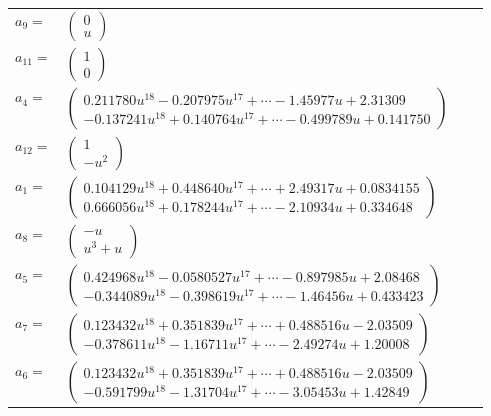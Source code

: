 \documentclass[1p]{elsarticle_modified}
\theoremstyle{definition}
\begin{document}
\begin{tabular}{m{7pt} m{180pt} m{7pt} m{180pt} }
\flushright $a_{9}=$&$\begin{pmatrix}0\\u\end{pmatrix}$ \\
\flushright $a_{11}=$&$\begin{pmatrix}1\\0\end{pmatrix}$ \\
\flushright $a_{4}=$&$\begin{pmatrix}0.211780 u^{18}-0.207975 u^{17}+\cdots-1.45977 u+2.31309\\-0.137241 u^{18}+0.140764 u^{17}+\cdots-0.499789 u+0.141750\end{pmatrix}$ \\
\flushright $a_{12}=$&$\begin{pmatrix}1\\- u^2\end{pmatrix}$ \\
\flushright $a_{1}=$&$\begin{pmatrix}0.104129 u^{18}+0.448640 u^{17}+\cdots+2.49317 u+0.0834155\\0.666056 u^{18}+0.178244 u^{17}+\cdots-2.10934 u+0.334648\end{pmatrix}$ \\
\flushright $a_{8}=$&$\begin{pmatrix}- u\\u^3+u\end{pmatrix}$ \\
\flushright $a_{5}=$&$\begin{pmatrix}0.424968 u^{18}-0.0580527 u^{17}+\cdots-0.897985 u+2.08468\\-0.344089 u^{18}-0.398619 u^{17}+\cdots-1.46456 u+0.433423\end{pmatrix}$ \\
\flushright $a_{7}=$&$\begin{pmatrix}0.123432 u^{18}+0.351839 u^{17}+\cdots+0.488516 u-2.03509\\-0.378611 u^{18}-1.16711 u^{17}+\cdots-2.49274 u+1.20008\end{pmatrix}$ \\
\flushright $a_{6}=$&$\begin{pmatrix}0.123432 u^{18}+0.351839 u^{17}+\cdots+0.488516 u-2.03509\\-0.591799 u^{18}-1.31704 u^{17}+\cdots-3.05453 u+1.42849\end{pmatrix}$ \\

\end{tabular}
\end{document}
